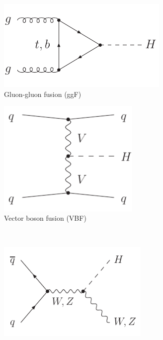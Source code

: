 \begin{figure}[b]
	\null\hfill
	\begin{subfigure}[b]{0.4\textwidth}
		\centering
		\includegraphics[width=\textwidth]{axodraw/ggF.pdf}
		\caption{Gluon-gluon fusion (ggF)}
		\label{fig:feyn:ggF}
	\end{subfigure}
	\hfill
	\begin{subfigure}[b]{0.4\textwidth}
		\centering
		\includegraphics[width=0.75\textwidth]{axodraw/VBF.pdf}
		\caption{Vector boson fusion (VBF)}
		\label{fig:feyn:VBF}
	\end{subfigure}
	\hfill\null
	\\\bigskip
	\null\hfill
	\begin{subfigure}[b]{0.4\textwidth}
		\centering
		\includegraphics[width=0.8\textwidth]{axodraw/VH.pdf}

\end{subfigure}
\end{figure}
